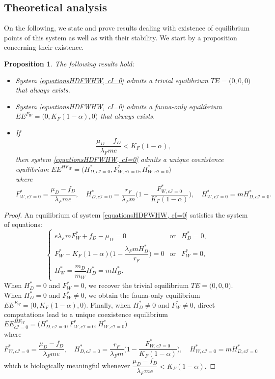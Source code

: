 \documentclass{article}
\newcommand{\lfw}{\lambda_{F}}
\newcommand{\lfw}{\lambda_{F}}
\newcommand{\cI}{c \mathcal{I}}
\newtheorem{prop}{Proposition}
\begin{document}
\subsection{Theoretical analysis}
On the following, we state and prove results dealing with existence of equilibrium points of this system as well as with their stability. We start by a proposition concerning their existence.


\begin{prop}
\label{theoremEquilibre, cI=0}
The following results hold:
\begin{itemize}
\item System \eqref{equationsHDFWHW, cI=0} admits a trivial equilibrium $TE = \Big(0,0,0\Big)$ that always exists.
\item System \eqref{equationsHDFWHW, cI=0} admits a fauna-only equilibrium $EE^{F_W} = \Big(0, K_F(1-\alpha), 0 \Big)$ that always exists.
\item If 
$$\dfrac{\mu_D - f_D}{\lfw m e}< K_F(1-\alpha),$$ 
then system \eqref{equationsHDFWHW, cI=0} admits a unique coexistence equilibrium $EE^{HF_W} = \Big(H^*_{D, \cI = 0}, F^*_{W, \cI = 0}, H^*_{W, \cI = 0} \Big)$ \\ 
where 
$$F^*_{W, \cI = 0} = \dfrac{\mu_D - f_D}{\lfw m e},
\quad 
H^*_{D, \cI = 0} = \dfrac{r_F}{\lfw m} \Big(1 - \dfrac{F^*_{W, \cI = 0}}{K_F(1-\alpha)} \Big),
\quad 
H^*_{W, \cI = 0} = m H^*_{D, \cI = 0}.$$
\end{itemize}
\end{prop}

\begin{proof}
An equilibrium of system \eqref{equationsHDFWHW, cI=0} satisfies the system of equations:
\begin{equation}\label{system-equilibre, cI=0}
\left\lbrace \begin{array}{cll}
 e \lfw m F_W^* + f_D - \mu_D = 0& \mbox{or} & H_D^* = 0,\\
F_W^* - K_F(1-\alpha) \Big(1 - \dfrac{\lfw m H^*_D}{r_F} \Big) = 0& \mbox{or} & F^*_W = 0,\\
H_W^* = \dfrac{m_D}{m_W} H_D^* = m H_D^*.&&
\end{array} \right.
\end{equation}
When $H_D^*=0$ and $F_W^*=0$, we recover the trivial equilibrium $TE = \Big(0,0,0\Big)$. When $H_D^*=0$ and $F_W^*\neq0$, we obtain the fauna-only equilibrium $EE^{F_W} = \Big(0, K_F(1-\alpha), 0 \Big)$. Finally, when $H_D^*\neq0$ and $F_W^*\neq0$, direct computations lead to a unique coexistence equilibrium 
$EE^{HF_W}_{\cI = 0} = \Big(H^*_{D, \cI = 0}, F^*_{W, \cI = 0}, H^*_{W, \cI = 0} \Big)$ \\ 
where 
$$
F^*_{W, \cI = 0} = \dfrac{\mu_D - f_D}{\lfw m e},
\quad
H^*_{D, \cI = 0} = \dfrac{r_F}{\lfw m} \Big(1 - \dfrac{F^*_{W, \cI = 0}}{K_F(1-\alpha)} \Big),
\quad
H^*_{W, \cI = 0} = m H^*_{D, \cI = 0}
$$
which is biologically meaningful whenever $\dfrac{\mu_D - f_D}{\lfw m e} < K_F(1-\alpha).$
\end{proof}
\end{document}
